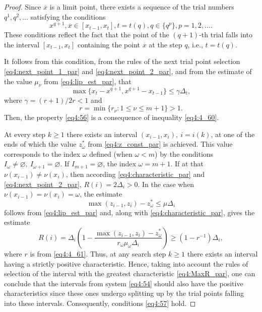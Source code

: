 \begin{proof}
  Since $\overline x$ is a limit point, there exists a sequence of the trial numbers $q^1,q^2,\dots$ satisfying the conditions
  \begin{equation}
    x^{q+1},\overline x\in[x_{t-1},x_t], t=t(q),q\in\{q^p\},p=1,2,\dots.
  \end{equation}
  These conditions reflect the fact that the point of the $(q+1)$-th trial falls into the interval $[x_{t-1},x_t]$ containing the point $\overline x$ at the step $q$, i.e., $t=t(q)$.

  It follows from this condition, from the rules of the next trial point selection \eqref{eq4:next_point_1_par} and \eqref{eq4:next_point_2_par}, and from the estimate of the value $\mu_\nu$ from \eqref{eq4:lip_est_par}, that
  \begin{equation}
    \label{eq4:4_60}
    \max\{x_t-x^{q+1},x^{q+1}-x_{t-1}\}\le\gamma \Delta_t,
  \end{equation}
  where $\gamma=(r+1)/2r<1$ and
  \begin{equation}
    r=\min\{r_\nu:1\le\nu\le m+1\}>1.
  \end{equation}
  \label{eq4:4_61}
  Then, the property \eqref{eq4:56} is a consequence of inequality \eqref{eq4:4_60}.

  At every step $k\ge 1$ there exists an interval $(x_{i-1},x_i), \:i=i(k)$, at one of the ends of which the value $z^*_\omega$ from \eqref{eq4:z_const_par} is achieved. This value corresponds to the index $\omega$ defined (when $\omega<m$) by the conditions $I_\omega\not= \varnothing,\: I_{\omega+1} =  \varnothing$. If $I_{m+1}= \varnothing$, the index $\omega=m+1$. If at that $\nu(x_{i -1} )\not = \nu(x_i )$, then according \eqref{eq4:characteristic_par} and \eqref{eq4:next_point_2_par}, $R(i)=2\Delta_i>0$. In the case when $\nu(x_{i -1} )= \nu(x_i )=\omega$, the estimate
  \begin{displaymath}
    \max(z_{i-1}, z_i)-z^*_\omega\le\mu\Delta_i
  \end{displaymath}
  follows from \eqref{eq4:lip_est_par} and, along with \eqref{eq4:characteristic_par}, gives the estimate
  \begin{displaymath}
    R(i)=\Delta_i\left(1-\frac{\max(z_{i-1},z_i)-z^*_\omega}{r_\omega\mu_\omega\Delta_i}\right)\ge (1-r^{-1})\Delta_i,
  \end{displaymath}
  where $r$ is from \eqref{eq4:4_61}. Thus, at any search step $k\ge 1$ there exists an interval having a strictly positive characteristic. Hence, taking into account the rules of selection of the interval with the greatest characteristic \eqref{eq4:MaxR_par}, one can conclude that the intervals from system \eqref{eq4:54} should also have the positive characteristics since these ones undergo splitting up by the trial points falling into these intervals. Consequently, conditions \eqref{eq4:57} hold.


\end{proof}
